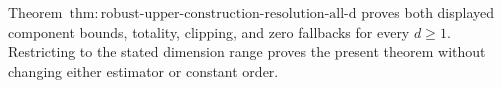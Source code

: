 Theorem~\(\mathrm{thm:robust\text{-}upper\text{-}construction\text{-}resolution\text{-}all\text{-}d}\) proves both displayed component bounds, totality, clipping, and zero fallbacks for every \(d\ge1\).  Restricting to the stated dimension range proves the present theorem without changing either estimator or constant order.